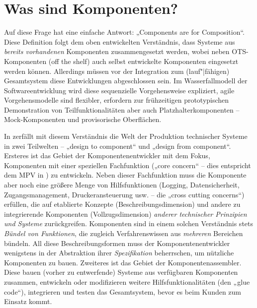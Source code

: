 \documentclass[12pt,a4paper]{article}
\begin{document}
\section{Was sind Komponenten?}

Auf diese Frage hat \cite{Szyperski2002} eine einfache Antwort: „Components
are for Composition“.  Diese Definition folgt dem oben entwickelten
Verständnis, dass Systeme aus \emph{bereits vorhandenen} Komponenten
zusammengesetzt werden, wobei neben OTS-Komponenten (off the shelf) auch
selbst entwickelte Komponenten eingesetzt werden können. Allerdings müssen vor
der Integration zum (lauf"|fähigen) Gesamtsystem diese Entwicklungen
abgeschlossen sein. Im Wasserfallmodell der Softwareentwicklung wird diese
sequenzielle Vorgehensweise expliziert, agile Vorgehensmodelle sind flexibler,
erfordern zur frühzeitigen prototypischen Demonstration von
Teilfunktionalitäten aber auch Platzhalterkomponenten -- Mock-Komponenten und
provisorische Oberflächen.

In \cite{Szyperski2002} zerfällt mit diesem Verständnis die Welt der
Produktion technischer Systeme in zwei Teilwelten -- „design to component“ und
„design from component“. Ersteres ist das Gebiet der Komponentenentwickler mit
dem Fokus, Komponenten mit einer speziellen Fachfunktion („core concern“ --
dies entspricht dem MPV in \cite{TESE2018}) zu entwickeln. Neben dieser
Fachfunktion muss die Komponente aber noch eine größere Menge von
Hilfsfunktionen (Logging, Datensicherheit, Zugangsmanagement,
Druckeransteuerung usw. -- die „cross cutting concerns“) erfüllen, die auf
etablierte Konzepte (Beschreibungsdimension) und andere zu integrierende
Komponenten (Vollzugsdimension) \emph{anderer technischer Prinzipien und
  Systeme} zurückgreifen.  Komponenten sind in einem solchen Verständnis stets
\emph{Bündel von Funktionen}, die zugleich Verfahrenswissen aus
\emph{mehreren} Bereichen bündeln.  All diese Beschreibungsformen muss der
Komponentenentwickler wenigstens in der Abstraktion ihrer \emph{Spezifikation}
beherrschen, um nützliche Komponenten zu bauen.  Zweiteres ist das Gebiet der
Komponentenassembler. Diese bauen (vorher zu entwerfende) Systeme aus
verfügbaren Komponenten zusammen, entwickeln oder modifizieren weitere
Hilfsfunktionalitäten (den „glue code“), integrieren und testen das
Gesamtsystem, bevor es beim Kunden zum Einsatz kommt.
\end{document}
